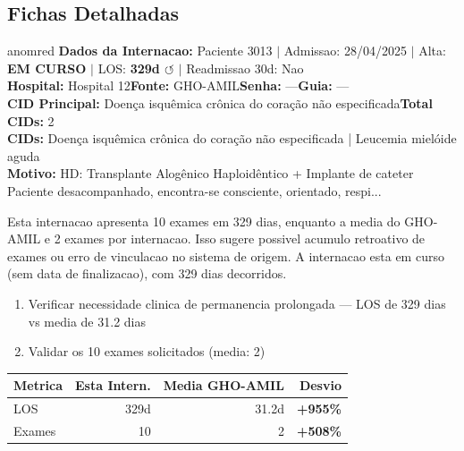 \documentclass[a4paper,10pt]{article}
\begin{document}
\subsection{Fichas Detalhadas}
\begin{anomalycard}[Internacao 3674 | GHO-AMIL | CRITICO (z=5.15)]{anomred}
\textbf{Dados da Internacao:} Paciente 3013 $\mid$ Admissao: 28/04/2025 $\mid$ Alta: \textcolor{anomorange}{\textbf{EM CURSO}} $\mid$ LOS: \textbf{329d \textcolor{anomorange}{$\circlearrowleft$}} $\mid$ Readmissao 30d: Nao\\
\textbf{Hospital:} Hospital 12\quad\textbf{Fonte:} GHO-AMIL\quad\textbf{Senha:} ---\quad\textbf{Guia:} ---\\
\textbf{CID Principal:} {\small Doença isquêmica crônica do coração não especificada}\quad\textbf{Total CIDs:} 2\\

\textbf{CIDs:} {\scriptsize Doença isquêmica crônica do coração não especificada | Leucemia mielóide aguda}\\

\textbf{Motivo:} {\scriptsize HD: Transplante Alogênico Haploidêntico + Implante de cateter  Paciente desacompanhado, encontra-se consciente, orientado, respi...}\\

\vspace{2pt}\begin{tcolorbox}[colback=severityred!20,colframe=anomred,title={\textbf{Interpretacao de Negocio}},fonttitle=\bfseries\small,left=4pt,right=4pt,top=3pt,bottom=3pt]
{\small Esta internacao apresenta 10 exames em 329 dias, enquanto a media do GHO-AMIL e 2 exames por internacao. Isso sugere possivel acumulo retroativo de exames ou erro de vinculacao no sistema de origem. A internacao esta em curso (sem data de finalizacao), com 329 dias decorridos.}
\end{tcolorbox}
\begin{tcolorbox}[colback=severityyellow!30,colframe=anomorange,title={\textbf{Recomendacoes Especificas}},fonttitle=\bfseries\small,left=4pt,right=4pt,top=3pt,bottom=3pt]
\begin{enumerate}[nosep,leftmargin=16pt]
\item {\small Verificar necessidade clinica de permanencia prolongada --- LOS de 329 dias vs media de 31.2 dias}
\item {\small Validar os 10 exames solicitados (media: 2)}
\end{enumerate}
\end{tcolorbox}
\begin{center}\begin{tabular}{l r r r}\toprule\textbf{Metrica} & \textbf{Esta Intern.} & \textbf{Media GHO-AMIL} & \textbf{Desvio} \\\midrule
LOS & 329d & 31.2d & \textcolor{anomred}{\textbf{+955\%}} \\
Exames & 10 & 2 & \textcolor{anomred}{\textbf{+508\%}} \\
\bottomrule\end{tabular}\end{center}


\end{anomalycard}
\end{document}
